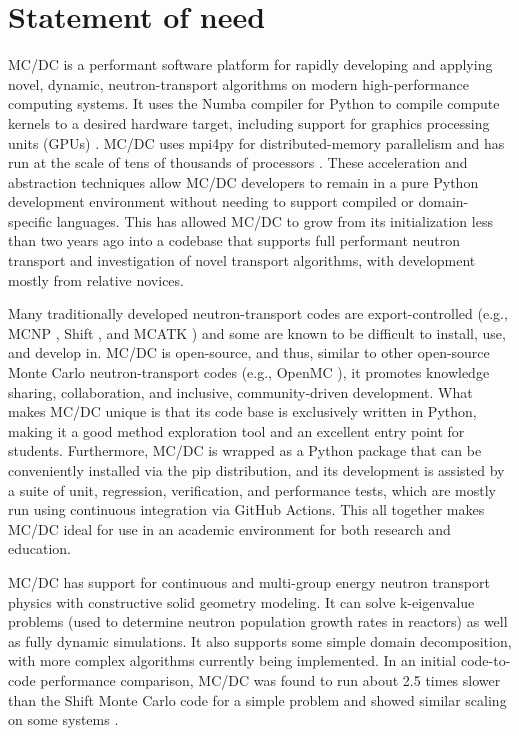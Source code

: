 \section{Statement of need}

MC/DC is a performant software platform for rapidly developing and applying novel, dynamic, neutron-transport algorithms on modern high-performance computing systems.
It uses the Numba compiler for Python to compile compute kernels to a desired hardware target, including support for graphics processing units (GPUs) \cite{lam_numba_2015}.
MC/DC uses mpi4py for distributed-memory parallelism \cite{dalcin_mpi4py_2021} and has run at the scale of tens of thousands of processors \cite{variansyah_mc23_mcdc}.
These acceleration and abstraction techniques allow MC/DC developers to remain in a pure Python development environment without needing to support compiled or domain-specific languages.
This has allowed MC/DC to grow from its initialization less than two years ago into a codebase that supports full performant neutron transport and investigation of novel transport algorithms, with development mostly from relative novices.

Many traditionally developed neutron-transport codes are export-controlled (e.g., MCNP \cite{MCNP_RisingArmstrongEtAl}, Shift \cite{pandya_implementation_2016}, and MCATK \cite{mcatk}) and some are known to be difficult to install, use, and develop in.
MC/DC is open-source, and thus, similar to other open-source Monte Carlo neutron-transport codes (e.g., OpenMC \cite{romano_openmc_2015}), it promotes knowledge sharing, collaboration, and inclusive, community-driven development.
What makes MC/DC unique is that its code base is exclusively written in Python, making it a good method exploration tool and an excellent entry point for students.
Furthermore, MC/DC is wrapped as a Python package that can be conveniently installed via the pip distribution, and its development is assisted by a suite of unit, regression, verification, and performance tests, which are mostly run using continuous integration via GitHub Actions.
This all together makes MC/DC ideal for use in an academic environment for both research and education.

MC/DC has support for continuous and multi-group energy neutron transport physics with constructive solid geometry modeling.
It can solve k-eigenvalue problems (used to determine neutron population growth rates in reactors) as well as fully dynamic simulations.
It also supports some simple domain decomposition, with more complex algorithms currently being implemented.
In an initial code-to-code performance comparison, MC/DC was found to run about 2.5 times slower than the Shift Monte Carlo code for a simple problem and showed similar scaling on some systems \cite{variansyah_mc23_mcdc}.

